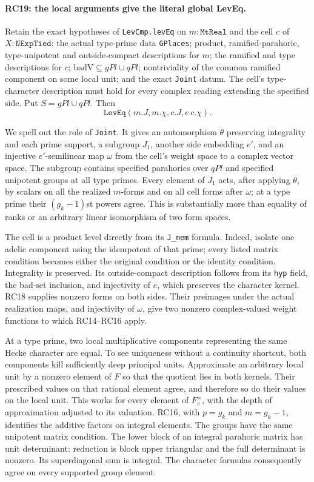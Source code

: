 \paragraph{RC19: the local arguments give the literal global LevEq.}
Retain the exact hypotheses of \texttt{LevCmp.levEq} on
$m:\texttt{MtReal}$ and the cell $c$ of $X:\texttt{NExpTied}$:
the actual type-prime data \texttt{GPlaces};
product, ramified-parahoric, type-unipotent and outside-compact
descriptions for $m$; the ramified and type descriptions for $c$;
$\mathrm{badV}\subseteq gPl\cup qPl$;
nontriviality of the common ramified component on some local unit;
and the exact \texttt{Joint} datum.
The cell's type-character description must hold for every complex
reading extending the specified side. Put $S=gPl\cup qPl$.
Then
\[
             \texttt{LevEq}(m.J,m.\chi,c.J,e\,c.\chi).
                                                               \tag{RC.21}
\]

We spell out the role of \texttt{Joint}. It gives an automorphism
$\theta$ preserving integrality and each prime support, a subgroup $J_1$,
another side embedding $e'$, and an injective $e'$-semilinear map
$\omega$ from the cell's weight space to a complex vector space.
The subgroup contains specified parahorics over $qPl$ and specified
unipotent groups at all type primes. Every element of $J_1$ acts,
after applying $\theta$, by scalars on all the realized $m$-forms and
on all cell forms after $\omega$; at a type prime their
$(g_k-1)$st powers agree. This is substantially more than equality
of ranks or an arbitrary linear isomorphism of two form spaces.

The cell is a product level directly from its \texttt{J\_mem} formula.
Indeed, isolate one adelic component using the idempotent of that
prime; every listed matrix condition becomes either the original
condition or the identity condition. Integrality is preserved.
Its outside-compact description follows from its \texttt{hyp} field,
the bad-set inclusion, and injectivity of $e$, which preserves the
character kernel. RC18 supplies nonzero forms on both sides.
Their preimages under the actual realization maps, and injectivity
of $\omega$, give two nonzero complex-valued weight functions to
which RC14--RC16 apply.

At a type prime, two local multiplicative components representing the
same Hecke character are equal. To see uniqueness without a continuity
shortcut, both components kill sufficiently deep principal units.
Approximate an arbitrary local unit by a nonzero element of $F$ so that
the quotient lies in both kernels. Their prescribed values on that
rational element agree, and therefore so do their values on the local
unit. This works for every element of $F_v^\times$, with the depth of
approximation adjusted to its valuation. RC16, with $p=g_k$ and
$m=g_k-1$, identifies the additive factors on integral elements.
The groups have the same unipotent matrix condition. The lower block
of an integral parahoric matrix has unit determinant: reduction is
block upper triangular and the full determinant is nonzero.
Its superdiagonal sum is integral. The character formulas consequently
agree on every supported group element.

